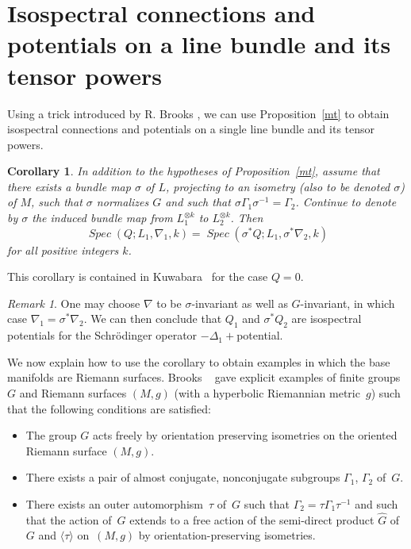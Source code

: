 \documentclass[12pt,leqno]{amsart}%
\newtheorem{cor}[theorem]{Corollary}
\theoremstyle{definition}
\theoremstyle{remark}
\newtheorem{remark}[theorem]{Remark}
\numberwithin{equation}{section}
\def\nab{{\nabla}}
\def\Spec{\operatorname{\textit{Spec}}}
\begin{document}
\section{Isospectral connections and potentials on a line bundle and its
tensor powers}

Using a trick introduced by R. Brooks \cite{Br}, we can use Proposition~\ref{mt}
to obtain isospectral connections and potentials on a single line bundle and its
tensor powers.

\begin{cor}
\label{corm} In addition to the hypotheses of Proposition~\ref{mt}, assume that
there exists a bundle map $\sigma$ of $L$, projecting to an isometry (also to be
denoted $\sigma$) of $M$, such that $\sigma$ normalizes $G$ and such that
$\sigma{{\Gamma}_{1}}\sigma^{-1}={{\Gamma}_{2}}$. Continue to denote by $\sigma$
the induced bundle map from ${L_{1}^{\otimes k}}$ to ${L_{2}^{\otimes k}}$. Then
\[
{\Spec}(Q; L_{1},\nabla_{1},k)={\Spec}(\sigma^{*}Q;
L_{1},\sigma^{*}\nabla_{2},k)
\]
for all positive integers $k$.
\end{cor}

This corollary is contained in Kuwabara~\cite{Ku90} for the case $Q=0$.
\begin{remark} One may choose $\nab$ to be $\sigma$-invariant as well as
$G$-invariant, in which case $\nab_1=\sigma^*\nab_2$.   We can then conclude
that $Q_1$ and $\sigma^*Q_2$ are isospectral potentials for the Schr\"odinger
operator $-\Delta_1 + $potential.
\end{remark}

We now explain how to use the corollary to obtain examples in which the base
manifolds are Riemann surfaces. Brooks ~\cite{Br} gave explicit examples of
finite groups~$G$ and Riemann surfaces $(M,g)$ (with a hyperbolic Riemannian
metric~$g$) such that the following conditions are satisfied:

\begin{itemize}
\item[(i)] The group $G$ acts freely by orientation preserving isometries on the
oriented Riemann surface $(M,g)$.

\item[(ii)] There exists a pair of almost conjugate, nonconjugate subgroups
$\Gamma_{1}$, $\Gamma_{2}$ of~$G$.

\item[(iii)] There exists an outer automorphism~$\tau$ of~$G$ such that
$\Gamma_{2} =\tau\Gamma_{1}\tau^{-1}$ and such that the action of~$G$ extends to
a free action of the semi-direct product $\widehat G$ of $G$ and $\langle
\tau\rangle$ on~$(M,g)$ by orientation-preserving isometries.
\end{itemize}
\end{document}
